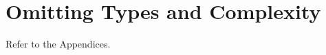 \documentclass{amsart}
\theoremstyle{plain}
\newtheorem{theorem}{Theorem}[section]
\newtheorem{lemma}[theorem]{Lemma}
\theoremstyle{definition}
\theoremstyle{remark}
\DeclareMathOperator{\Clo}{Clo}
\DeclareMathOperator{\CSP}{CSP}
\DeclareMathOperator{\Pol}{Pol}
\DeclareMathOperator{\NP}{NP}
\begin{document}
\begin{comment}
\begin{lemma}
    Let $\EuScript{A}$ be a relational structure. 
    If $\Pol(\EuScript{A})$ contains a majority operation, $\CSP(\EuScript{\EuScript{A}})$ is polynomial-time decidable. 
\end{lemma}

\begin{theorem}
    Let $\mathbf{A}$ be a finite strictly simple surjective algebra.
    If all the elements of $\Clo(\mathbf{A})$ are essentially unary, then $\CSP(\mathbf{A})$ is $\NP$-complete. 
    Otherwise, $\CSP(\mathbf{A})$ is polynomial-time decidable. 
    \begin{proof}

    \end{proof}
\end{theorem}
\end{comment}

\section{Omitting Types and Complexity}
Refer to the Appendices. 

\begin{comment}
\begin{lemma}
    \label{pol}
    Let $\mathbf{A}$ be a finite idempotent algebra. 
    If $e \in \Pol_1(\mathbf{A})$ and $U=e(A)$, then 
    \begin{enumerate}
        \item $\CSP(\mathbf{A})$ is polynomial-time decidable iff $\CSP(\mathbf{A}|U)$ is. 
        \item $\CSP(\mathbf{A})$ is $\NP$-complete iff $\CSP(\mathbf{A}|U)$ is. 
    \end{enumerate}
    \begin{proof}
        We show that 
    \end{proof}
\end{lemma}
\end{comment}
\end{document}

